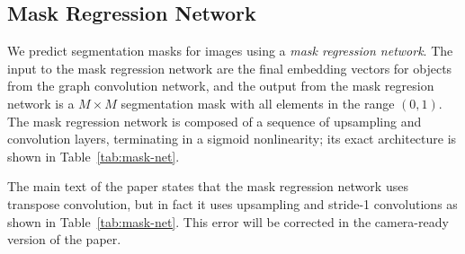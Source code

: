 \documentclass[10pt,twocolumn,letterpaper]{article}
\begin{document}
\begin{table}
  \centering
  \setlength{\tabcolsep}{1mm}
  \vspace{1mm}
  \caption{
    Architecture of the box regression network.
  }
  \label{tab:box-net}
\end{table}

\subsection{Mask Regression Network}
We predict segmentation masks for images using a \emph{mask regression network}.
The input to the mask regression network are the final embedding vectors for objects from the
graph convolution network, and the output from the mask regresion network is a $M\times M$
segmentation mask with all elements in the range $(0, 1)$. The mask regression network is composed
of a sequence of upsampling and convolution layers, terminating in a sigmoid nonlinearity; its exact
architecture is shown in Table~\ref{tab:mask-net}.

The main text of the paper states that the mask regression network uses transpose convolution, but
in fact it uses upsampling and stride-1 convolutions as shown in Table~\ref{tab:mask-net}. This error
will be corrected in the camera-ready version of the paper.
\end{document}
